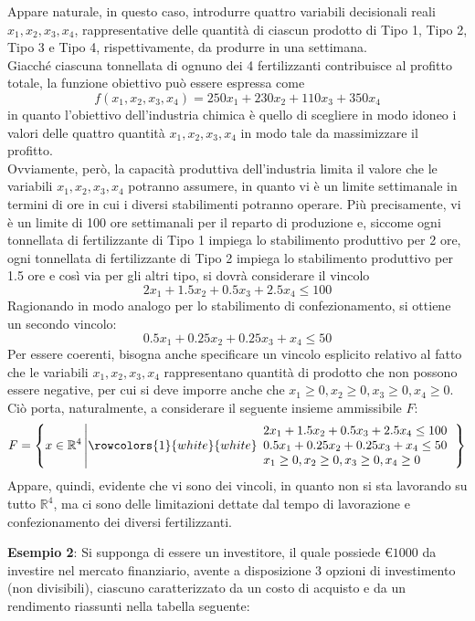 \documentclass[a4paper]{extarticle}
\begin{document}
\vspace{1em}
\noindent
Appare naturale, in questo caso, introdurre quattro variabili decisionali reali $x_1,x_2,x_3,x_4$, rappresentative delle quantità di ciascun prodotto di Tipo 1, Tipo 2, Tipo 3 e Tipo 4, rispettivamente, da produrre in una settimana.\\
Giacché ciascuna tonnellata di ognuno dei 4 fertilizzanti contribuisce al profitto totale, la funzione obiettivo può essere espressa come
\[f(x_1,x_2,x_3,x_4)=250x_1+230x_2+110x_3+350x_4\]
in quanto l'obiettivo dell'industria chimica è quello di scegliere in modo idoneo i valori delle quattro quantità $x_1,x_2,x_3,x_4$ in modo tale da massimizzare il profitto.\\
Ovviamente, però, la capacità produttiva dell'industria limita il valore che le variabili $x_1,x_2,x_3,x_4$ potranno assumere, in quanto vi è un limite settimanale in termini di ore in cui i diversi stabilimenti potranno operare. Più precisamente, vi è un limite di 100 ore settimanali per il reparto di produzione e, siccome ogni tonnellata di fertilizzante di Tipo 1 impiega lo stabilimento produttivo per 2 ore, ogni tonnellata di fertilizzante di Tipo 2 impiega lo stabilimento produttivo per 1.5 ore e così via per gli altri tipo, si dovrà considerare il vincolo
\[2x_1+1.5x_2+0.5x_3+2.5x_4 \leq 100\]
Ragionando in modo analogo per lo stabilimento di confezionamento, si ottiene un secondo vincolo:
\[0.5x_1+0.25x_2+0.25x_3+x_4 \leq 50\]
Per essere coerenti, bisogna anche specificare un vincolo esplicito relativo al fatto che le variabili $x_1,x_2,x_3,x_4$ rappresentano quantità di prodotto che non possono essere negative, per cui si deve imporre anche che $x_1 \geq 0, x_2 \geq 0, x_3 \geq 0, x_4  \geq 0$.\\
Ciò porta, naturalmente, a considerare il seguente insieme ammissibile $F$:
\[F = \left\{x \in \mathbb{R}^4 \left\vert
\rowcolors{1}{white}{white}
\begin{array}{l}
    2x_1+1.5x_2+0.5x_3+2.5x_4  \leq 100\\
    0.5x_1+0.25x_2+0.25x_3+x_4 \leq 50\\
    x_1 \geq 0, x_2 \geq 0, x_3 \geq 0, x_4  \geq 0
\end{array}
\right.
\right\}\]
Appare, quindi, evidente che vi sono dei vincoli, in quanto non si sta lavorando su tutto $\mathbb{R}^4$, ma ci sono delle limitazioni dettate dal tempo di lavorazione e confezionamento dei diversi fertilizzanti.

\vspace{1em}
\noindent
\textbf{Esempio 2}: Si supponga di essere un investitore, il quale possiede €$1000$ da investire nel mercato finanziario, avente a disposizione $3$ opzioni di investimento (non divisibili), ciascuno caratterizzato da un costo di acquisto e da un rendimento riassunti nella tabella seguente:
\end{document}
